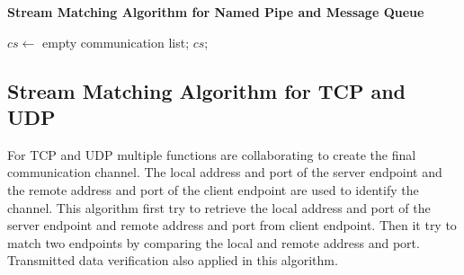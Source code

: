\begin{algorithm}[H]
\DontPrintSemicolon
\caption{{\bf Stream Matching Algorithm for Named Pipe and Message Queue} \label{channelAlg1}}
$cs \leftarrow$ empty communication list;\;
\KwRet $cs$;\;
\end{algorithm} 


\subsection{Stream Matching Algorithm for TCP and UDP}
For TCP and UDP multiple functions are collaborating to create the final communication channel. The local address and port of the server endpoint and the remote address and port of the client endpoint are used to identify the channel. This algorithm first try to retrieve the local address and port of the server endpoint and remote address and port from client endpoint. Then it try to match two endpoints by comparing the local and remote address and port. Transmitted data verification also applied in this algorithm.

